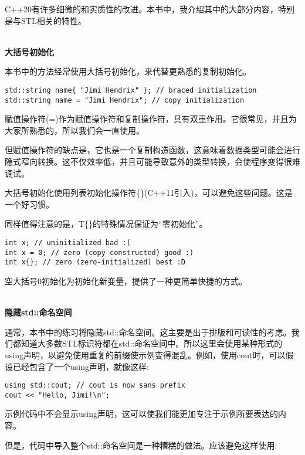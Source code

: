 C++20有许多细微的和实质性的改进。本书中，我介绍其中的大部分内容，特别是与STL相关的特性。

\hspace*{\fill} \\ %
\noindent
\textbf{大括号初始化}

本书中的方法经常使用大括号初始化，来代替更熟悉的复制初始化。

\begin{lstlisting}[style=styleCMake]
std::string name{ "Jimi Hendrix" }; // braced initialization
std::string name = "Jimi Hendrix"; // copy initialization
\end{lstlisting}

赋值操作符(=)作为赋值操作符和复制操作符，具有双重作用。它很常见，并且为大家所熟悉的，所以我们会一直使用。

但赋值操作符的缺点是，它也是一个复制构造函数，这意味着数据类型可能会进行隐式窄向转换。这不仅效率低，并且可能导致意外的类型转换，会使程序变得很难调试。

大括号初始化使用列表初始化操作符\{\}(C++11引入)，可以避免这些问题。这是一个好习惯。

同样值得注意的是，T\{\}的特殊情况保证为“零初始化”。

\begin{lstlisting}[style=styleCXX]
int x; // uninitialized bad :(
int x = 0; // zero (copy constructed) good :)
int x{}; // zero (zero-initialized) best :D
\end{lstlisting}

空大括号0初始化为初始化新变量，提供了一种更简单快捷的方式。

\hspace*{\fill} \\ %
\noindent
\textbf{隐藏std::命名空间}

通常，本书中的练习将隐藏std::命名空间。这主要是出于排版和可读性的考虑。我们都知道大多数STL标识符都在std::命名空间中。所以这里会使用某种形式的using声明，以避免使用重复的前缀使示例变得混乱。例如，使用cout时，可以假设已经包含了一个using声明，就像这样:

\begin{lstlisting}[style=styleCXX]
using std::cout; // cout is now sans prefix
cout << "Hello, Jimi!\n";
\end{lstlisting}

示例代码中不会显示using声明，这可以使我们能更加专注于示例所要表达的内容。

但是，代码中导入整个std::命名空间是一种糟糕的做法。应该避免这样使用:

